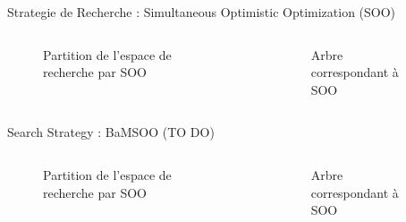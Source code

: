 \begin{frame}{Strategie de Recherche : Simultaneous Optimistic Optimization (SOO)}
    \begin{columns}
        \begin{column}[t]{0.5\textwidth} 
            \begin{figure}
                \centering
                
                \caption{Partition de l'espace de recherche par SOO}
            \end{figure} 
     
            \end{column}
                 
            \begin{column}[t]{0.5\textwidth}
                \begin{figure}
                    \centering
                    
                    \caption{Arbre correspondant à SOO}
                \end{figure} 
            \end{column}
                 
    \end{columns}

\end{frame}

\begin{frame}{Search Strategy : BaMSOO (TO DO)}
    \begin{columns}
        \begin{column}[t]{0.5\textwidth} 
            \begin{figure}
                \centering
                
                \caption{Partition de l'espace de recherche par SOO}
            \end{figure} 
     
            \end{column}
                 
            \begin{column}[t]{0.5\textwidth}
                \begin{figure}
                    \centering
                    
                    \caption{Arbre correspondant à SOO}
                \end{figure} 
            \end{column}
                 
    \end{columns}
\end{frame}

